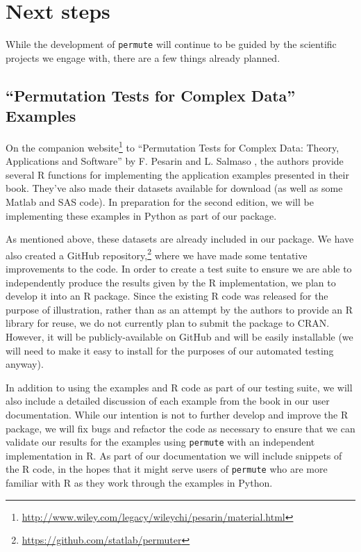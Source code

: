 \chapter{\label{ch:nextsteps}Next steps}

While the development of \texttt{permute} will continue to be guided by the
scientific projects we engage with, there are a few things already planned.

\section{\label{sec:book}``Permutation Tests for Complex Data'' Examples}

On the companion
website\footnote{\url{http://www.wiley.com/legacy/wileychi/pesarin/material.html}}
to ``Permutation Tests for Complex Data: Theory, Applications and
Software'' by F. Pesarin and L. Salmaso \cite{pesarin2010permutation}, the
authors provide several R functions for implementing the application examples
presented in their book.  They've also made their datasets available for download
(as well as some Matlab and SAS code).  In preparation for the second edition,
we will be implementing these examples in Python as part of our package.

As mentioned above, these datasets are already included in our package.  We have
also created a GitHub
repository,\footnote{\url{https://github.com/statlab/permuter}} where we have
made some tentative improvements to the code.  In order to create a test suite
to ensure we are able to independently produce the results given by the R
implementation, we plan to develop it into an R package.  Since the existing R
code was released for the purpose of illustration, rather than as an attempt by
the authors to provide an R library for reuse, we do not currently plan to
submit the package to CRAN.  However, it will be publicly-available on GitHub
and will be easily installable (we will need to make it easy to install for the
purposes of our automated testing anyway).

In addition to using the examples and R code as part of our testing suite, we
will also include a detailed discussion of each example from the book in our
user documentation.  While our intention is not to further develop and improve
the R package, we will fix bugs and refactor the code as necessary to ensure
that we can validate our results for the examples using \texttt{permute} with
an independent implementation in R.  As part of our documentation we will
include snippets of the R code, in the hopes that it might serve users of
\texttt{permute} who are more familiar with R as they work through the examples
in Python.

